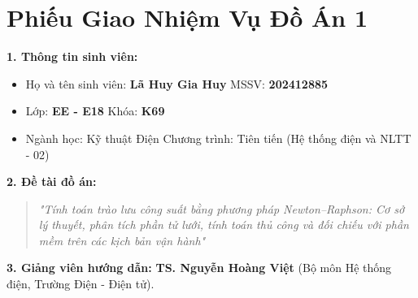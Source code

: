 \documentclass[12pt,a4paper,oneside]{report}
\begin{document}
\chapter*{Phiếu Giao Nhiệm Vụ Đồ Án 1}

\noindent \textbf{1. Thông tin sinh viên:}
\begin{itemize}
    \item Họ và tên sinh viên: \textbf{Lã Huy Gia Huy} \hspace{2cm} MSSV: \textbf{202412885}
    \item Lớp: \textbf{EE - E18} \hspace{4cm} Khóa: \textbf{K69}
    \item Ngành học: Kỹ thuật Điện \hspace{3cm} Chương trình: Tiên tiến (Hệ thống điện và NLTT - 02)
\end{itemize}

\noindent \textbf{2. Đề tài đồ án:}
\begin{quote}
\textit{"Tính toán trào lưu công suất bằng phương pháp Newton--Raphson: Cơ sở lý thuyết, phân tích phần tử lưới, tính toán thủ công và đối chiếu với phần mềm trên các kịch bản vận hành"}
\end{quote}

\noindent \textbf{3. Giảng viên hướng dẫn:} \textbf{TS. Nguyễn Hoàng Việt} (Bộ môn Hệ thống điện, Trường Điện - Điện tử).
\end{document}
